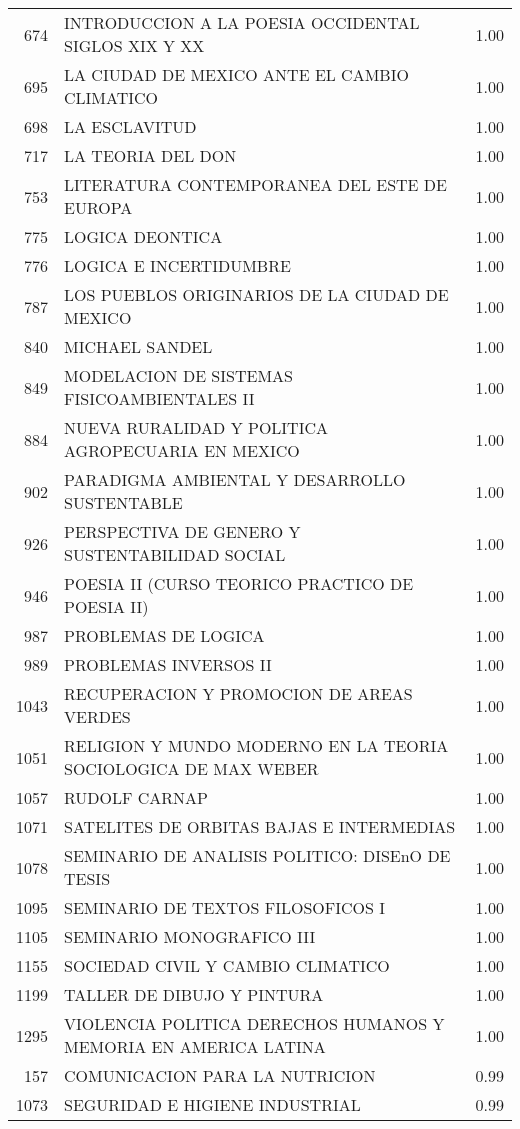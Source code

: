 \documentclass[12pt]{article}
\begin{document}
\begin{table}[ht]
\begin{tabular}{rlr}
  674 & INTRODUCCION A LA POESIA OCCIDENTAL SIGLOS XIX Y XX & 1.00 \\ 
  695 & LA CIUDAD DE MEXICO ANTE EL CAMBIO CLIMATICO & 1.00 \\ 
  698 & LA ESCLAVITUD & 1.00 \\ 
  717 & LA TEORIA DEL DON & 1.00 \\ 
  753 & LITERATURA CONTEMPORANEA DEL ESTE DE EUROPA & 1.00 \\ 
  775 & LOGICA DEONTICA & 1.00 \\ 
  776 & LOGICA E INCERTIDUMBRE & 1.00 \\ 
  787 & LOS PUEBLOS ORIGINARIOS DE LA CIUDAD DE MEXICO & 1.00 \\ 
  840 & MICHAEL SANDEL & 1.00 \\ 
  849 & MODELACION DE SISTEMAS FISICOAMBIENTALES II & 1.00 \\ 
  884 & NUEVA RURALIDAD Y POLITICA AGROPECUARIA EN MEXICO & 1.00 \\ 
  902 & PARADIGMA AMBIENTAL Y DESARROLLO SUSTENTABLE & 1.00 \\ 
  926 & PERSPECTIVA DE GENERO Y SUSTENTABILIDAD SOCIAL & 1.00 \\ 
  946 & POESIA II (CURSO TEORICO PRACTICO DE POESIA II) & 1.00 \\ 
  987 & PROBLEMAS DE LOGICA & 1.00 \\ 
  989 & PROBLEMAS INVERSOS II & 1.00 \\ 
  1043 & RECUPERACION Y PROMOCION DE AREAS VERDES & 1.00 \\ 
  1051 & RELIGION Y MUNDO MODERNO EN LA TEORIA SOCIOLOGICA DE MAX WEBER & 1.00 \\ 
  1057 & RUDOLF CARNAP & 1.00 \\ 
  1071 & SATELITES DE ORBITAS BAJAS E INTERMEDIAS & 1.00 \\ 
  1078 & SEMINARIO DE ANALISIS POLITICO: DISEnO DE TESIS & 1.00 \\ 
  1095 & SEMINARIO DE TEXTOS FILOSOFICOS I & 1.00 \\ 
  1105 & SEMINARIO MONOGRAFICO III & 1.00 \\ 
  1155 & SOCIEDAD CIVIL Y CAMBIO CLIMATICO & 1.00 \\ 
  1199 & TALLER DE DIBUJO Y PINTURA & 1.00 \\ 
  1295 & VIOLENCIA POLITICA DERECHOS HUMANOS Y MEMORIA EN AMERICA LATINA & 1.00 \\ 
  157 & COMUNICACION PARA LA NUTRICION & 0.99 \\ 
  1073 & SEGURIDAD E HIGIENE INDUSTRIAL & 0.99 \\ 

\end{tabular}
\end{table}
\end{document}
